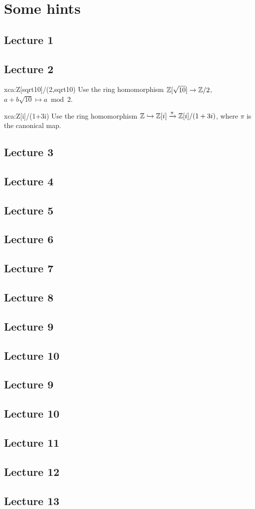 \chapter{Some hints}


\section*{Lecture 1}
\section*{Lecture 2}

\begin{sol}{xca:Z[sqrt10]/(2,sqrt10)}
	Use the ring homomorphism $\mathbb{Z}[\sqrt{10}]\to\mathbb{Z}/2$, $a+b\sqrt{10}\mapsto a\bmod 2$. 	
\end{sol}

\begin{sol}{xca:Z[i]/(1+3i)}
	Use the ring homomorphism $\mathbb{Z}\hookrightarrow\mathbb{Z}[i]\xrightarrow{\pi}\mathbb{Z}[i]/(1+3i)$, where
	$\pi$ is the canonical map. 	
\end{sol}

\section*{Lecture 3}
\section*{Lecture 4}
\section*{Lecture 5}
\section*{Lecture 6}
\section*{Lecture 7}
\section*{Lecture 8}
\section*{Lecture 9}
\section*{Lecture 10}
\section*{Lecture 9}
\section*{Lecture 10}
\section*{Lecture 11}
\section*{Lecture 12}
\section*{Lecture 13}
